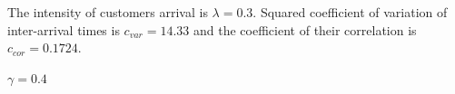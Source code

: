 \documentclass[12pt, a4paper]{article}
\begin{document}
The intensity of customers arrival is $\lambda = 0.3.$  Squared coefficient of variation of inter-arrival times is ${c_{var}=14.33}$ and the coefficient of their correlation is $c_{cor} = 0.1724.$

 $\gamma = 0.4$


\begin{figure}[h]
\begin{minipage}[h]{0.49\linewidth}
\end{minipage}
\hfill
\begin{minipage}[h]{0.49\linewidth}

\end{minipage}
\end{figure}
\end{document}
